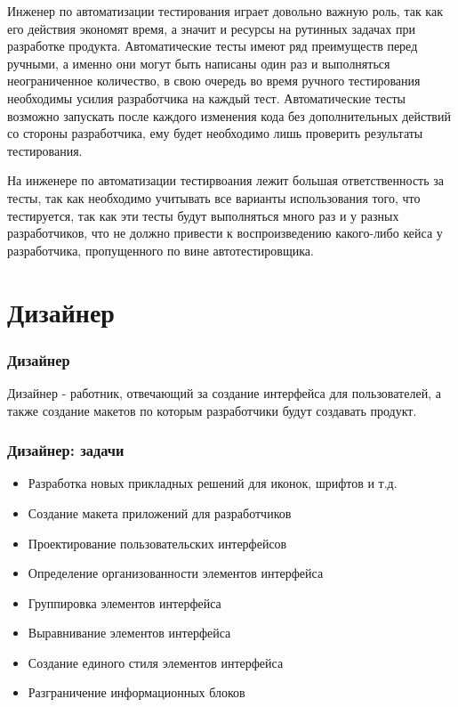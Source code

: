 \documentclass{../industrial-development}
\begin{document}
	\lecturenotes
		Инженер по автоматизации тестирования играет довольно важную роль, так как его действия экономят время, а значит и ресурсы на рутинных задачах при разработке продукта. Автоматические тесты имеют ряд преимуществ перед ручными, а именно они могут быть написаны один раз и выполняться неограниченное количество, в свою очередь во время ручного тестирования необходимы усилия разработчика на каждый тест. Автоматические тесты возможно запускать после каждого изменения кода без дополнительных действий со стороны разработчика, ему будет необходимо лишь проверить результаты тестирования. 
		
		На инженере по автоматизации тестирвоания лежит большая ответственность за тесты, так как необходимо учитывать все варианты использования того, что тестируется, так как эти тесты будут выполняться много раз и у разных разработчиков, что не должно привести к воспроизведению какого-либо кейса у разработчика, пропущенного по вине автотестировщика.
		
	\section{Дизайнер }
	
	\begin{frame} \frametitle{Дизайнер}
		\begin{block}{}
			\alert {Дизайнер} - работник, отвечающий за создание интерфейса для пользователей, а также создание макетов по которым разработчики будут создавать продукт.
		\end{block}
		
	\end{frame}
	
	\begin{frame} \frametitle{Дизайнер: задачи}
		\begin{itemize}
			\item Разработка новых прикладных решений для иконок, шрифтов и т.д.
			\item Создание макета приложений для разработчиков
			\item Проектирование пользовательских интерфейсов
			\item Определение организованности элементов интерфейса
			\item Группировка элементов интерфейса
			\item Выравнивание элементов интерфейса
			\item Создание единого стиля элементов интерфейса
			\item Разграничение информационных блоков
		\end{itemize}
	\end{frame}
	
\end{document}
